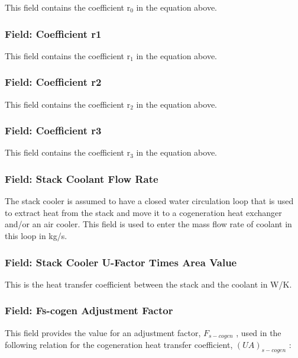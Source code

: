 This field contains the coefficient r\(_{0}\) in the equation above.

\subsubsection{Field: Coefficient r1}\label{field-coefficient-r1}

This field contains the coefficient r\(_{1}\) in the equation above.

\subsubsection{Field: Coefficient r2}\label{field-coefficient-r2}

This field contains the coefficient r\(_{2}\) in the equation above.

\subsubsection{Field: Coefficient r3}\label{field-coefficient-r3}

This field contains the coefficient r\(_{3}\) in the equation above.

\subsubsection{Field: Stack Coolant Flow Rate}\label{field-stack-coolant-flow-rate}

The stack cooler is assumed to have a closed water circulation loop that is used to extract heat from the stack and move it to a cogeneration heat exchanger and/or an air cooler. This field is used to enter the mass flow rate of coolant in this loop in kg/s.

\subsubsection{Field: Stack Cooler U-Factor Times Area Value}\label{field-stack-cooler-u-factor-times-area-value}

This is the heat transfer coefficient between the stack and the coolant in W/K.

\subsubsection{Field: Fs-cogen Adjustment Factor}\label{field-fs-cogen-adjustment-factor}

This field provides the value for an adjustment factor, \({F_{s - cogen}}\) , used in the following relation for the cogeneration heat transfer coefficient, \({\left( {UA} \right)_{s - cogen}}\) :


